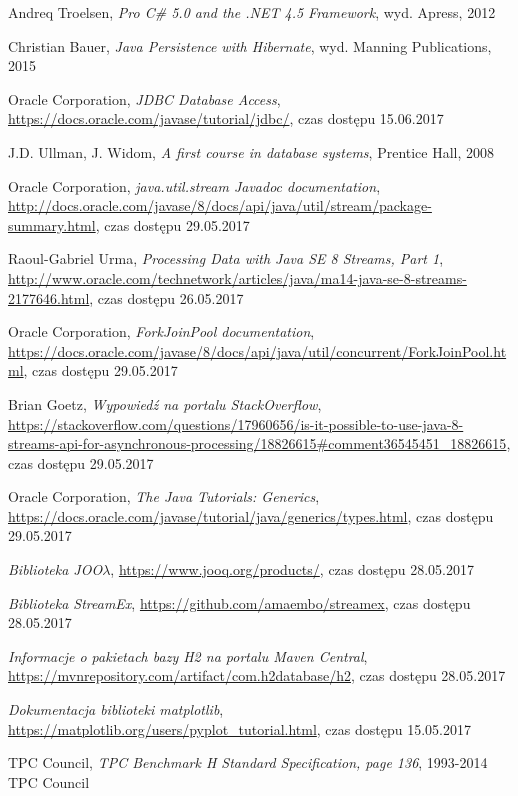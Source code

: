 \documentclass[12pt,twoside,openright]{extarticle}
\begin{document}
\cleardoublepage
\begin{thebibliography}{9}

        Andreq Troelsen,
        \textit{Pro C\# 5.0 and the .NET 4.5 Framework}, wyd. Apress, 2012

        Christian Bauer,
        \textit{Java Persistence with Hibernate},
        wyd. Manning Publications, 2015

        Oracle Corporation,
        \textit{JDBC Database Access}, 
        \url{https://docs.oracle.com/javase/tutorial/jdbc/}, czas dostępu 15.06.2017

        J.D. Ullman, J. Widom,
        \textit{A first course in database systems}, 
        Prentice Hall, 2008

        Oracle Corporation,
        \textit{java.util.stream Javadoc documentation},
        \url{http://docs.oracle.com/javase/8/docs/api/java/util/stream/package-summary.html}, czas dostępu 29.05.2017

        Raoul-Gabriel Urma,
        \textit{Processing Data with Java SE 8 Streams, Part 1}, 
        \url{http://www.oracle.com/technetwork/articles/java/ma14-java-se-8-streams-2177646.html}, czas dostępu 26.05.2017


        Oracle Corporation,
        \textit{ForkJoinPool documentation}, 
        \url{https://docs.oracle.com/javase/8/docs/api/java/util/concurrent/ForkJoinPool.html}, czas dostępu 29.05.2017

        Brian Goetz,
        \textit{Wypowiedź na portalu StackOverflow},
        \url{https://stackoverflow.com/questions/17960656/is-it-possible-to-use-java-8-streams-api-for-asynchronous-processing/18826615\#comment36545451\_18826615}, czas dostępu 29.05.2017

        Oracle Corporation,
        \textit{The Java Tutorials: Generics}, 
        \url{https://docs.oracle.com/javase/tutorial/java/generics/types.html}, czas dostępu 29.05.2017

        \textit{Biblioteka JOO$\lambda$}, \url{https://www.jooq.org/products/}, czas dostępu 28.05.2017

        \textit{Biblioteka StreamEx}, \url{https://github.com/amaembo/streamex}, czas dostępu 28.05.2017

        \textit{Informacje o pakietach bazy H2 na portalu Maven Central}, \url{https://mvnrepository.com/artifact/com.h2database/h2}, czas dostępu 28.05.2017

        \textit{Dokumentacja biblioteki matplotlib}, \url{https://matplotlib.org/users/pyplot\_tutorial.html}, czas dostępu 15.05.2017

        TPC Council,
        \textit{TPC Benchmark H Standard Specification, page 136},
        1993-2014 TPC Council



\end{thebibliography}
\end{document}
